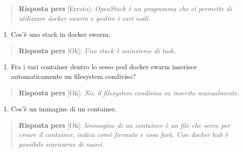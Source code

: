 \begin{quote}
\textbf{Risposta pers} {[}Errata{]}: \emph{OpenStack è un programma che
ci permette di utilizzare docker swarm e gestire i vari nodi.}
\end{quote}

\begin{enumerate}
\def\labelenumi{\arabic{enumi}.}
\setcounter{enumi}{5}
\item
  Cos'è uno stack in docker swarm;
\end{enumerate}

\begin{quote}
\textbf{Risposta pers} {[}Ok{]}: \emph{Uno stack è
un\textquotesingle insieme di task.}
\end{quote}

\begin{enumerate}
\def\labelenumi{\arabic{enumi}.}
\setcounter{enumi}{6}
\item
  Fra i vari container dentro lo sesso pod docker swarm inserisce
  automaticamente un filesystem condiviso?
\end{enumerate}

\begin{quote}
\textbf{Risposta pers} {[}Ok{]}: \emph{No, il filesystem condiviso va
inserito manualmente.}
\end{quote}

\begin{enumerate}
\def\labelenumi{\arabic{enumi}.}
\setcounter{enumi}{7}
\item
  Cos'è un immagine di un container.
\end{enumerate}

\begin{quote}
\textbf{Risposta pers} {[}Ok{]}: \emph{l\textquotesingle immagine di un
container è un \textquotesingle file\textquotesingle{} che serve per
creare il container, indica com\textquotesingle è formato e cosa farà.
Con docker hub è possibile scaricarne di nuovi.}
\end{quote}
